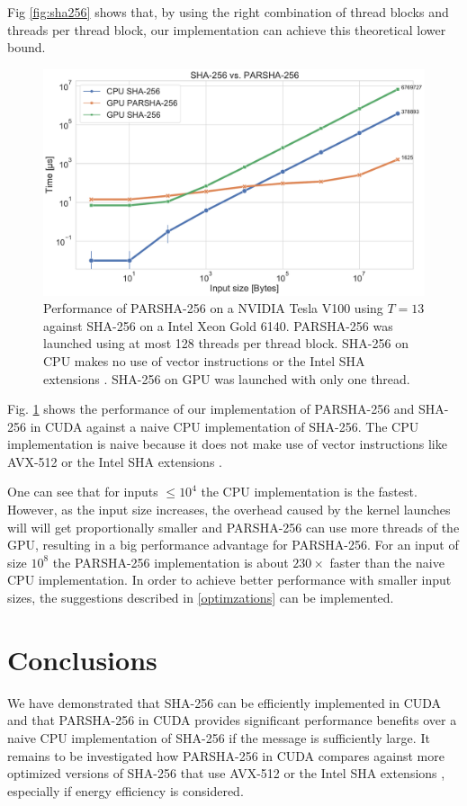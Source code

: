 \documentclass[letterpaper]{article}
\begin{document}
Fig \ref{fig:sha256} shows that, by using the right combination of thread blocks and  threads per thread block, our implementation can achieve this theoretical lower bound.


\begin{figure}[t]\centering
\includegraphics[scale=0.23]{plot_parsha.pdf}
  \caption{Performance of PARSHA-256 on a NVIDIA Tesla V100 using $T = 13$  against SHA-256 on a Intel Xeon Gold 6140. PARSHA-256 was launched using at most 128 threads per thread block. SHA-256 on CPU makes no use of vector instructions or the Intel SHA extensions \cite{SHA_Extensions}. SHA-256 on GPU was launched with only one thread.   \label{fig:parsha256}}
\end{figure}

Fig. \ref{fig:parsha256} shows the performance of our implementation of PARSHA-256 and SHA-256 in CUDA against a naive CPU implementation of SHA-256.
The CPU implementation is naive because it does not make use of vector instructions like AVX-512 \cite{avx512} or the Intel SHA extensions \cite{SHA_Extensions}.

 
One can see that for inputs $\leq  10^4$ the CPU implementation is the fastest. However, as the input size increases, the overhead caused by the kernel launches will will get proportionally smaller and PARSHA-256 can use more threads of the GPU, resulting in a big performance advantage for PARSHA-256.
For an input of size $10^8$ the PARSHA-256 implementation is about $230 \times$ faster than the naive CPU implementation.
In order to achieve better performance with smaller input sizes, the suggestions described in \ref{optimzations} can be implemented.






\section{Conclusions}
We have demonstrated that SHA-256 can be efficiently implemented in CUDA and that PARSHA-256 in CUDA provides significant performance benefits over a naive CPU implementation of SHA-256 if the message is sufficiently large.
It remains to be investigated how PARSHA-256 in CUDA compares against more optimized versions of SHA-256 that use AVX-512 \cite{avx512} or the Intel SHA extensions \cite{SHA_Extensions}, especially if energy efficiency is considered.
\end{document}
